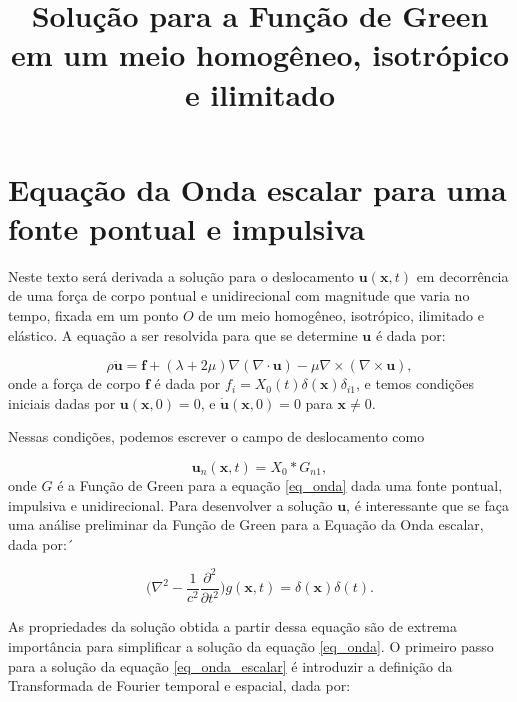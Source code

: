 \documentclass[a4paper,10pt]{article}
\title{Solução para a Função de Green em um meio homogêneo, isotrópico e ilimitado}
\author{}
\begin{document}
\maketitle

\begin{abstract}

\end{abstract}

\section{Equação da Onda escalar para uma fonte pontual e impulsiva}

Neste texto será derivada a solução para o deslocamento $\mathbf{u}(\mathbf{x},t)$ em decorrência de uma força de corpo pontual e unidirecional com magnitude que varia no tempo, fixada em um ponto $O$ de um meio homogêneo, isotrópico, ilimitado e elástico. A equação a ser resolvida para que se determine $\mathbf{u}$ é dada por:

\begin{equation}
 \rho\mathbf{\ddot{u}} = \mathbf{f} + (\lambda + 2\mu)\nabla(\nabla\cdot\mathbf{u}) - \mu\nabla\times(\nabla\times\mathbf{u}),
 \label{eq_onda}
\end{equation}
onde a força de corpo $\mathbf{f}$ é dada por $f_i = X_0(t)\delta(\mathbf{x})\delta_{i1}$, e temos condições iniciais dadas por $\mathbf{u}(\mathbf{x},0) = 0$, e $\mathbf{\dot{u}}(\mathbf{x},0) = 0$ para $\mathbf{x}\neq 0$.

Nessas condições, podemos escrever o campo de deslocamento como

\begin{equation}
 \mathbf{u}_n(\mathbf{x},t) = X_0\ast{G_{n1}},
\end{equation}
onde $G$ é a Função de Green para a equação \ref{eq_onda} dada uma fonte pontual, impulsiva e unidirecional. Para desenvolver a solução $\mathbf{u}$, é interessante que se faça uma análise preliminar da Função de Green para a Equação da Onda escalar, dada por:´

\begin{equation}
 \bigg(\nabla^2 - \frac{1}{c^2}\frac{\partial^2}{\partial{t^2}}\bigg)g(\mathbf{x},t) = \delta(\mathbf{x})\delta(t).
 \label{eq_onda_escalar}
\end{equation}

As propriedades da solução obtida a partir dessa equação são de extrema importância para simplificar a solução da equação \ref{eq_onda}. O primeiro passo para a solução da equação \ref{eq_onda_escalar} é introduzir a definição da Transformada de Fourier temporal e espacial, dada por:
\end{document}
